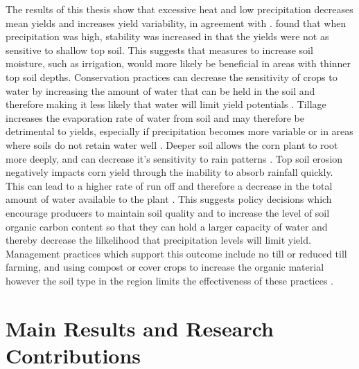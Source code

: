 The results of this thesis show that excessive heat and low precipitation decreases mean yields and increases yield variability, in agreement with \cite{williams2016soil} . 	\cite{lee2015topsoil} found that when precipitation was high, stability was increased in that the yields were not as sensitive to shallow top soil. This suggests that measures to increase soil moisture, such as irrigation, would more likely be beneficial in areas with thinner top soil depths. Conservation practices can decrease the sensitivity of crops to water by increasing the amount of water that can be held in the soil and therefore making it less likely that water will limit yield potentials \citep{IowaSWCS}. Tillage increases the evaporation rate of water from soil and may therefore be detrimental to yields, especially if precipitation becomes more variable or in areas where soils do not retain water well \citep{IowaSWCS}. Deeper soil allows the corn plant to root more deeply, and can decrease it's sensitivity to rain patterns \citep{Guilpart}. Top soil erosion negatively impacts corn yield through the inability to absorb rainfall quickly. This can lead to a higher rate of run off and therefore a decrease in the total amount of water available to the plant \citep{Guilpart}. This suggests policy decisions which encourage producers to maintain soil quality and to increase the level of soil organic carbon content so that they can hold a larger capacity of water and thereby decrease the lilkelihood that precipitation levels will limit yield.  Management practices which support this outcome include no till or reduced till farming, and using compost or cover crops to increase the organic material however the soil type in the region limits the effectiveness of these practices \citep{williams2016soil}.

\section{Main Results and Research Contributions}

